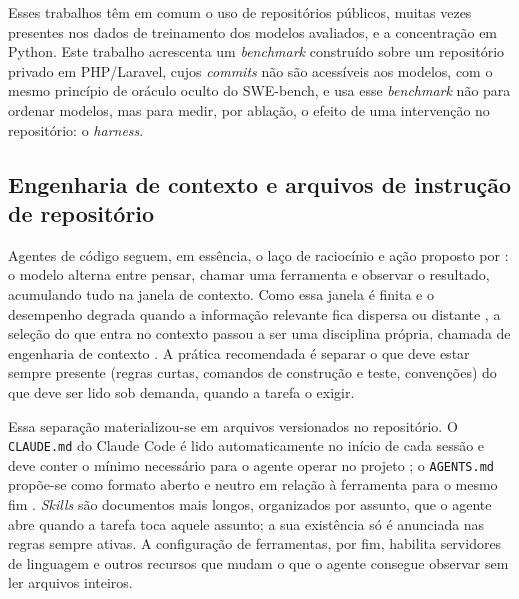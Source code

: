 Esses trabalhos têm em comum o uso de repositórios públicos, muitas vezes
presentes nos dados de treinamento dos modelos avaliados, e a concentração em
Python. Este trabalho acrescenta um \textit{benchmark} construído sobre um
repositório privado em PHP/Laravel, cujos \textit{commits} não são acessíveis
aos modelos, com o mesmo princípio de oráculo oculto do SWE-bench, e usa esse
\textit{benchmark} não para ordenar modelos, mas para medir, por ablação, o
efeito de uma intervenção no repositório: o \textit{harness}.

\subsection{Engenharia de contexto e arquivos de instrução de repositório}
\label{sec:ref-contexto}

Agentes de código seguem, em essência, o laço de raciocínio e ação proposto por
: o modelo alterna entre pensar, chamar uma ferramenta
e observar o resultado, acumulando tudo na janela de contexto. Como essa janela
é finita e o desempenho degrada quando a informação relevante fica dispersa ou
distante \cite{liu2024lost}, a seleção do que entra no contexto passou a ser
uma disciplina própria, chamada de engenharia de contexto
\cite{anthropic2025context}. A prática recomendada é separar o que deve estar
sempre presente (regras curtas, comandos de construção e teste, convenções) do
que deve ser lido sob demanda, quando a tarefa o exigir.

Essa separação materializou-se em arquivos versionados no repositório. O
\texttt{CLAUDE.md} do Claude Code é lido automaticamente no início de cada
sessão e deve conter o mínimo necessário para o agente operar no projeto
\cite{anthropic2025bestpractices}; o \texttt{AGENTS.md} propõe-se como formato
aberto e neutro em relação à ferramenta para o mesmo fim \cite{agentsmd2025}.
\textit{Skills} são documentos mais longos, organizados por assunto, que o
agente abre quando a tarefa toca aquele assunto; a sua existência só é anunciada
nas regras sempre ativas. A configuração de ferramentas, por fim, habilita
servidores de linguagem e outros recursos que mudam o que o agente consegue
observar sem ler arquivos inteiros.

